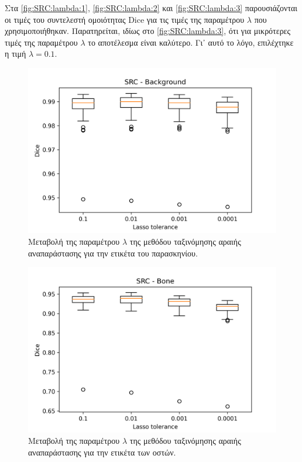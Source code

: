 \documentclass[a4paper,12pt]{article}
\begin{document}
Στα \autoref{fig:SRC:lambda:1}, \autoref{fig:SRC:lambda:2} και
\autoref{fig:SRC:lambda:3} παρουσιάζονται οι τιμές του συντελεστή ομοιότητας
Dice για τις τιμές της παραμέτρου $\lambda$ που χρησιμοποιήθηκαν. Παρατηρείται,
ιδίως στο \autoref{fig:SRC:lambda:3}, ότι για μικρότερες τιμές της παραμέτρου
$\lambda$ το αποτέλεσμα είναι καλύτερο. Γι᾽ αυτό το λόγο, επιλέχτηκε η τιμή
$\lambda = 0.1$.

\begin{figure}[H]
    \centering
    \includegraphics[width=0.85\linewidth]{SRC_Lasso_tolerance_Background_plot.png}
    \caption{Μεταβολή της παραμέτρου $\lambda$ της μεθόδου ταξινόμησης αραιής
             αναπαράστασης για την ετικέτα του παρασκηνίου.}
    \label{fig:SRC:lambda:1}
\end{figure}

\begin{figure}[H]
    \centering
    \includegraphics[width=0.85\linewidth]{SRC_Lasso_tolerance_Bone_plot.png}
    \caption{Μεταβολή της παραμέτρου $\lambda$ της μεθόδου ταξινόμησης αραιής
             αναπαράστασης για την ετικέτα των οστών.}
    \label{fig:SRC:lambda:2}
\end{figure}
\end{document}
